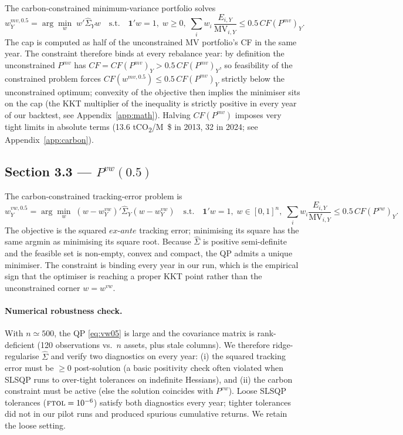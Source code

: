 \documentclass[11pt,a4paper]{article}
\begin{document}
The carbon-constrained minimum-variance portfolio solves
\begin{equation}\label{eq:mv05}
  w^{mv,0.5}_Y = \arg\min_{w}\; w'\widehat\Sigma_Y w \quad \text{s.t.}\quad
  \mathbf{1}'w=1,\; w\ge 0,\;
  \sum_i w_i \,\frac{E_{i,Y}}{\text{MV}_{i,Y}} \le 0.5\,CF(P^{mv})_Y.
\end{equation}
The cap is computed as half of the unconstrained MV portfolio's CF in
the same year. The constraint therefore binds at every rebalance year:
by definition the unconstrained $P^{mv}$ has $CF=CF(P^{mv})_Y >
0.5\,CF(P^{mv})_Y$, so feasibility of the constrained problem forces
$CF(w^{mv,0.5}) \le 0.5\,CF(P^{mv})_Y$ strictly below the unconstrained
optimum; convexity of the objective then implies the minimiser sits on
the cap (the KKT multiplier of the inequality is strictly positive in
every year of our backtest, see Appendix~\ref{app:math}). Halving
$CF(P^{mv})$ imposes very tight limits in absolute terms (13.6
\si{tCO_2/M\$} in 2013, 32 in 2024; see Appendix~\ref{app:carbon}).

\subsection{Section 3.3 --- $P^{vw}(0.5)$}\label{sec:vw05}

The carbon-constrained tracking-error problem is
\begin{equation}\label{eq:vw05}
  w^{vw,0.5}_Y = \arg\min_{w}\; (w-w^{vw}_Y)'\widehat\Sigma_Y (w-w^{vw}_Y)
  \quad \text{s.t.}\quad
  \mathbf{1}'w=1,\; w\in[0,1]^n,\;
  \sum_i w_i \frac{E_{i,Y}}{\text{MV}_{i,Y}} \le 0.5\,CF(P^{vw})_Y.
\end{equation}
The objective is the squared $ex$-$ante$ tracking error; minimising
its square has the same argmin as minimising its square root. Because
$\widehat\Sigma$ is positive semi-definite and the feasible set is
non-empty, convex and compact, the QP admits a unique minimiser. The
constraint is binding every year in our run, which is the empirical sign
that the optimiser is reaching a proper KKT point rather than the
unconstrained corner $w=w^{vw}$.

\paragraph{Numerical robustness check.} With $n\simeq 500$, the QP
\eqref{eq:vw05} is large and the covariance matrix is rank-deficient
(120 observations vs.\ $n$ assets, plus stale columns). We therefore
ridge-regularise $\widehat\Sigma$ and verify two diagnostics on every
year: (i) the squared tracking error must be $\ge 0$ post-solution (a
basic positivity check often violated when SLSQP runs to over-tight
tolerances on indefinite Hessians), and (ii) the carbon constraint must
be active (else the solution coincides with $P^{vw}$).
Loose SLSQP tolerances ($\textsc{ftol}=10^{-6}$) satisfy both
diagnostics every year; tighter tolerances did not in our pilot runs and
produced spurious cumulative returns. We retain the loose setting.
\end{document}
